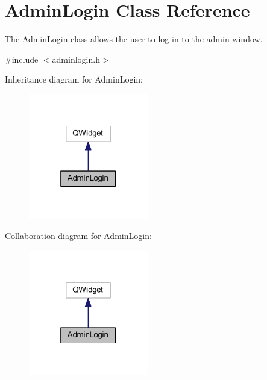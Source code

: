 \hypertarget{class_admin_login}{}\section{Admin\+Login Class Reference}
\label{class_admin_login}


The \hyperlink{class_admin_login}{Admin\+Login} class allows the user to log in to the admin window.  




{\ttfamily \#include $<$adminlogin.\+h$>$}



Inheritance diagram for Admin\+Login\+:
\nopagebreak
\begin{figure}[H]
\begin{center}
\leavevmode
\includegraphics[width=148pt]{class_admin_login__inherit__graph}
\end{center}
\end{figure}


Collaboration diagram for Admin\+Login\+:
\nopagebreak
\begin{figure}[H]
\begin{center}
\leavevmode
\includegraphics[width=148pt]{class_admin_login__coll__graph}
\end{center}
\end{figure}
